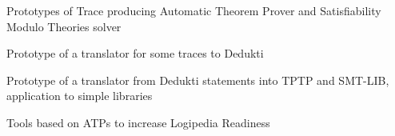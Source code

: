 \begin{workpackage}






\begin{wpdelivs}
  \begin{wpdeliv}[due=6,miles=??,id=ATPtrace1,dissem=PU,nature=DEM,lead=Lie]
    {Prototypes of Trace producing Automatic Theorem Prover and Satisfiability Modulo Theories solver}
  \end{wpdeliv}

  \begin{wpdeliv}[due=18,miles=??,id=Trace2Dedukti1,dissem=PU,nature=DEM,lead=Imt]
    {Prototype of a translator for some traces to Dedukti}
  \end{wpdeliv}

  \begin{wpdeliv}[due=24,miles=??,id=Dedukti2ATP1,dissem=PU,nature=DEM,lead=Sac]
    {Prototype of a translator from Dedukti statements into TPTP and
      SMT-LIB, application to simple libraries}
  \end{wpdeliv}

  \begin{wpdeliv}[due=36,miles=??,id=ReadinessCode,dissem=PU,nature=DEM,lead=Sac]
    {Tools based on ATPs to increase Logipedia Readiness}
  \end{wpdeliv}


\end{wpdelivs}
\end{workpackage}
